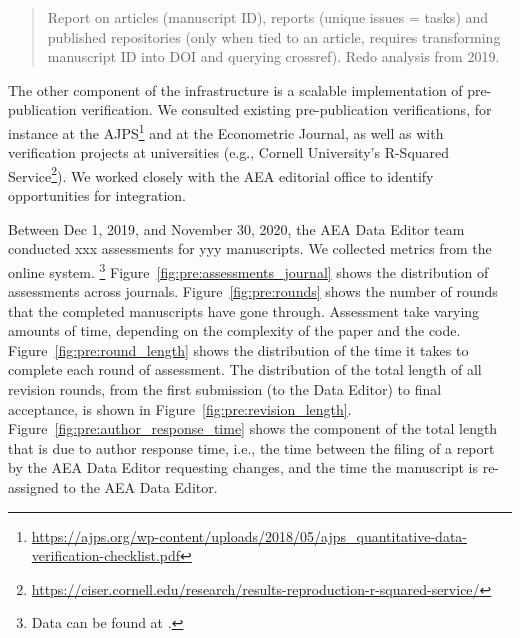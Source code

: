 \documentclass[PP]{AEA}
\newcommand{\urlcite}[2]{#2\footnote{\url{#1}}}
\begin{document}
\begin{quote}
Report on articles (manuscript ID), reports (unique issues = tasks) and published repositories (only when tied to an article, requires transforming manuscript ID into DOI and querying crossref). Redo analysis from 2019.

\end{quote}

The other component of the infrastructure is a scalable implementation of pre-publication verification. We consulted existing pre-publication verifications, for instance at the \urlcite{https://ajps.org/wp-content/uploads/2018/05/ajps_quantitative-data-verification-checklist.pdf}{\ac{AJPS}} and at the Econometric Journal, as well as with verification projects at universities (e.g., Cornell University's \urlcite{https://ciser.cornell.edu/research/results-reproduction-r-squared-service/}{R-Squared Service}). We worked closely with the AEA editorial office to identify opportunities for integration. 



Between Dec 1, 2019, and November 30, 2020, the AEA Data Editor team conducted 
xxx assessments for yyy manuscripts.
%
We collected metrics from the online system.%
\footnote{Data  can be found at \citet{E117876V1}.}
Figure~\ref{fig:pre:assessments_journal} shows the distribution of  assessments across journals. Figure~\ref{fig:pre:rounds} shows the number of rounds that the \jiramcs{} completed manuscripts have gone through. Assessment take varying amounts of time, depending on the complexity of the paper and the code. Figure~\ref{fig:pre:round_length} shows the distribution of the time it takes to complete each round of assessment. The distribution of the total length of all revision rounds, from the first submission (to the Data Editor) to final acceptance, is shown in Figure~\ref{fig:pre:revision_length}. Figure~\ref{fig:pre:author_response_time} shows the component of the total length that is due to author response time, i.e., the time between the filing of a report by the AEA Data Editor requesting changes, and the time the manuscript is re-assigned to the AEA Data Editor. 
\end{document}
